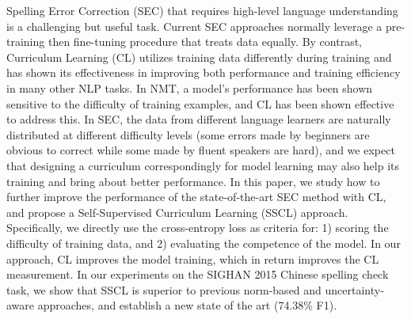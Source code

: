 Spelling Error Correction (SEC) that requires high-level language understanding is a challenging but useful task. Current SEC approaches normally leverage a pre-training then fine-tuning procedure that treats data equally. By contrast, Curriculum Learning (CL) utilizes training data differently during training and has shown its effectiveness in improving both performance and training efficiency in many other NLP tasks. In NMT, a model's performance has been shown sensitive to the difficulty of training examples, and CL has been shown effective to address this. In SEC, the data from different language learners are naturally distributed at different difficulty levels (some errors made by beginners are obvious to correct while some made by fluent speakers are hard), and we expect that designing a curriculum correspondingly for model learning may also help its training and bring about better performance. In this paper, we study how to further improve the performance of the state-of-the-art SEC method with CL, and propose a Self-Supervised Curriculum Learning (SSCL) approach. Specifically, we directly use the cross-entropy loss as criteria for: 1) scoring the difficulty of training data, and 2) evaluating the competence of the model. In our approach, CL improves the model training, which in return improves the CL measurement. In our experiments on the SIGHAN 2015 Chinese spelling check task, we show that SSCL is superior to previous norm-based and uncertainty-aware approaches, and establish a new state of the art (74.38\% F1).
